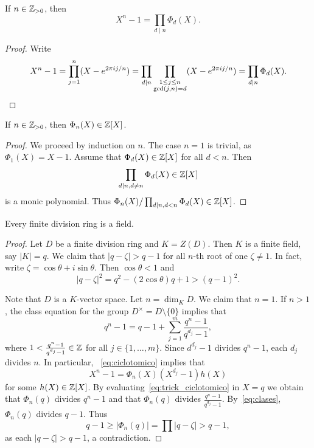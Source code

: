 \begin{lemma}
	If $n\in\mathbb{Z}_{>0}$, then
	\[
		X^n-1=\prod_{d\mid n}\Phi_d(X).
	\]
\end{lemma}

\begin{proof}
	Write 
	\[
		X^n-1=\prod_{j=1}^n (X-e^{2\pi ij/n})
		=\prod_{d\mid n}\prod_{\substack{1\leq j\leq n\\\gcd(j,n)=d}}(X-e^{2\pi ij/n})
		=\prod_{d\mid n}\Phi_d(X).\qedhere 
	\]
\end{proof}

\begin{lemma}
	If $n\in\mathbb{Z}_{>0}$, then $\Phi_n(X)\in\mathbb{Z}[X]$.
\end{lemma}

\begin{proof}
	We proceed by induction on $n$. The case $n=1$ is trivial, as 
	$\Phi_1(X)=X-1$. Assume that $\Phi_d(X)\in\mathbb{Z}[X]$ for all $d<n$.
	Then 
	\[
		\prod_{d\mid n,d\ne n}\Phi_d(X)\in\mathbb{Z}[X]
	\]
	is a monic polynomial. Thus $\Phi_n(X)/\prod_{d\mid
	n,d<n}\Phi_d(X)\in\mathbb{Z}[X]$.
\end{proof}

\begin{theorem}[Wedderburn]
\label{thm:Wedderburn} 
	Every finite division ring is a field. 
\end{theorem}

\begin{proof}
    Let $D$ be a finite division ring   
	and $K=Z(D)$. Then $K$ is a finite field, say $|K|=q$. 
	We claim that $|q-\zeta|>q-1$ for all $n$-th 
	root of one $\zeta\ne 1$.  In fact, write $\zeta=\cos\theta+i\sin\theta$. Then 
	$\cos\theta<1$ and 
	\[
	|q-\zeta|^2=q^2-(2\cos\theta)q+1>(q-1)^2.
	\]
	
	Note that
	$D$ is a $K$-vector space. Let 
	$n=\dim_KD$.  We claim that $n=1$. If $n>1$, the 
	class equation for the group 
	$D^\times=D\setminus\{0\}$ 
        implies that 
	\begin{equation}
		\label{eq:clases}
		q^n-1=q-1+\sum_{j=1}^m \frac{q^n-1}{q^{d_j}-1},
	\end{equation}
	where $1<\frac{q^n-1}{q^{d_j}-1}\in\mathbb{Z}$ for all $j\in\{1,\dots,m\}$. 
	Since $d^{d_j}-1$ divides $q^n-1$, each $d_j$ divides $n$. In particular,
	~\eqref{eq:ciclotomico} implies that 
	\begin{equation}
		\label{eq:trick_ciclotomico}
		X^n-1=\Phi_n(X)(X^{d_j}-1)h(X)
	\end{equation}
	for some $h(X)\in\mathbb{Z}[X]$. 
	By evaluating~\eqref{eq:trick_ciclotomico} in $X=q$  
	we obtain that $\Phi_n(q)$ divides $q^n-1$ and that $\Phi_n(q)$
	divides $\frac{q^n-1}{q^{d_j}-1}$. By~\eqref{eq:clases}, 
	$\Phi_n(q)$ divides $q-1$. 
	Thus  
	\[
		q-1\geq |\Phi_n(q)|=\prod |q-\zeta|>q-1,
	\]
	as each $|q-\zeta|>q-1$, 
	a contradiction. 
\end{proof}

